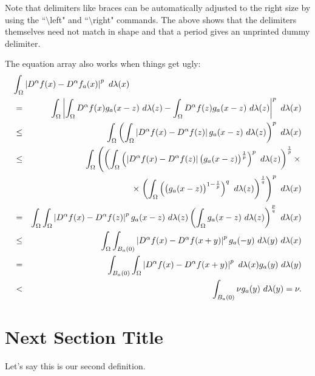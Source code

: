 Note that delimiters like braces can be automatically adjusted to the right size
by using the ``$\setminus $left" and ``$\setminus $right" commands.
The above shows that the delimiters themselves need not match in shape and
that a period gives an unprinted dummy delimiter.




The equation array also works when things get ugly:
\begin{eqnarray*}
\lefteqn{
\int _{\Omega
} \left|
D^\alpha f(x)
-D^\alpha f_a (x)\right| ^p
\ d\lambda (x)
}
\\
& = &
\int _{\Omega
}
\left| \int _\Omega D^\alpha f(x) g_a (x-z) \ d\lambda (z)-
\int _\Omega D^\alpha f (z) g_a (x-z)  \ d\lambda (z)
\right| ^p
\ d\lambda (x)
\\
& \leq &
\int _\Omega \left(
\int _\Omega \left| D^\alpha f(x)-D^\alpha f (z) \right|
g_a (x-z)  \ d\lambda (z)
\right) ^p
\ d\lambda (x)
\\
& \leq &
\int _\Omega \left(
\left(
\int _\Omega \left( \left| D^\alpha f(x)-D^\alpha f (z) \right|
\big( g_a (x-z)\big) ^{1\over p}  \right) ^p \ d\lambda (z)
\right) ^{1\over p}
\times \right.
\\
& &
\quad
\times
\left.
\left(
\int _\Omega
\left(
\big( g_a (x-z)\big) ^{1-{1\over p}}  \right) ^q \ d\lambda (z)
\right) ^{1\over q}
\right) ^p
\ d\lambda (x)
\\
& = &
\int _\Omega
\int _\Omega \left| D^\alpha f(x)-D^\alpha f (z) \right| ^p
g_a (x-z) \ d\lambda (z)
\left(
\int _\Omega
g_a (x-z)   \ d\lambda (z)
\right) ^{p\over q}
\ d\lambda (x)
\\
& \leq &
\int _\Omega
\int _{B_a (0)} \left| D^\alpha f(x)-D^\alpha f (x+y) \right| ^p
g_a (-y) \ d\lambda (y)
\ d\lambda (x)
\\
& = &
\int _{B_a (0)}
\int _\Omega
\left| D^\alpha f(x)-D^\alpha f (x+y) \right| ^p
\ d\lambda (x)
g_a (y) \ d\lambda (y)
\\
& < &
\int _{B_a (0)}
\nu
g_a (y) \ d\lambda (y)
=\nu .
\end{eqnarray*}





\section{Next Section Title}



\begin{definition}
\label{def2}

Let's say this is our second definition.

\end{definition}


